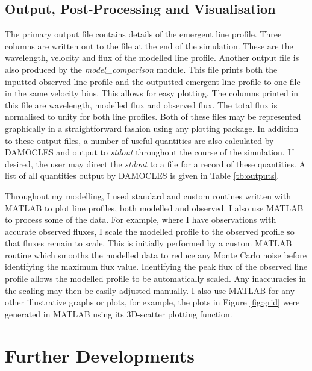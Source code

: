 \subsection{Output, Post-Processing and Visualisation}

The primary output file contains details of the emergent line profile.  Three columns are written out to the file at the end of the simulation.  These are the wavelength, velocity and flux of the modelled line profile.  Another output file is also produced by the \textit{model\_comparison} module.  This file prints both the inputted observed line profile and the outputted emergent line profile to one file in the same velocity bins.  This allows for easy plotting.  The columns printed in  this file are wavelength, modelled flux and observed flux. The total flux is normalised to unity for both line profiles.  Both of these files may be represented graphically in a straightforward fashion using any plotting package.  In addition to these output files, a number of useful quantities are also calculated by DAMOCLES and output to \textit{stdout} throughout the course of the simulation.  If desired, the user may direct the \textit{stdout} to a file for a record of these quantities.  A list of all quantities output by DAMOCLES is given in Table \ref{tb:outputs}.

Throughout my modelling, I used standard and custom routines written with MATLAB to plot line profiles, both modelled and observed.  I also use MATLAB to process some of the data.  For example, where I have observations with accurate observed fluxes, I scale the modelled profile to the observed profile so that fluxes remain to scale.  This is initially performed by a custom MATLAB routine which smooths the modelled data to reduce any Monte Carlo noise before identifying the maximum flux value.  Identifying the peak flux of the observed line profile allows the modelled profile to be automatically scaled.  Any inaccuracies in the scaling may then be easily adjusted manually.  I also use MATLAB for any other illustrative graphs or plots, for example, the plots in Figure \ref{fig:grid} were generated in MATLAB using its 3D-scatter plotting function.

\section{Further Developments}
\label{limitations}

